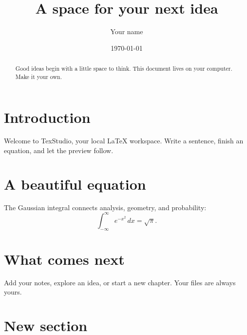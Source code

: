 \documentclass[11pt]{article}
\title{A space for your next idea}
\author{Your name}
\date{\today}
\begin{document}
\maketitle

\begin{abstract}
Good ideas begin with a little space to think.
This document lives on your computer. Make it your own.
\end{abstract}

\section{Introduction}
Welcome to TexStudio, your local LaTeX workspace.
Write a sentence, finish an equation, and let the preview follow.

\section{A beautiful equation}
The Gaussian integral connects analysis, geometry, and probability:
\begin{equation}
  \int_{-\infty}^{\infty} e^{-x^2}\,dx = \sqrt{\pi}.
\end{equation}

\section{What comes next}
Add your notes, explore an idea, or start a new chapter.
Your files are always yours.

\section{New section}
\end{document}

